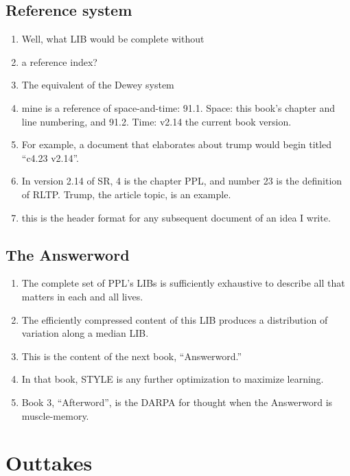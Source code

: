 \documentclass[
]{book}
\providecommand{\tightlist}{%
  \setlength{\itemsep}{0pt}\setlength{\parskip}{0pt}}
\begin{document}
\hypertarget{reference-system}{%
\subsection{Reference system}\label{reference-system}}

\begin{enumerate}
\def\labelenumi{\arabic{enumi}.}
\setcounter{enumi}{87}
\tightlist
\item
  Well, what LIB would be complete without
\item
  a reference index?
\item
  The equivalent of the Dewey system
\item
  mine is a reference of space-and-time:
  91.1. Space: this book's chapter and line numbering, and
  91.2. Time: v2.14 the current book version.
\item
  For example, a document that elaborates about trump would begin titled ``c4.23 v2.14''.
\item
  In version 2.14 of SR, 4 is the chapter PPL, and number 23 is the definition of RLTP. Trump, the article topic, is an example.
\item
  this is the header format for any subsequent document of an idea I write.
\end{enumerate}

\hypertarget{the-answerword}{%
\subsection{The Answerword}\label{the-answerword}}

\begin{enumerate}
\def\labelenumi{\arabic{enumi}.}
\setcounter{enumi}{94}
\item
  The complete set of PPL's LIBs is sufficiently exhaustive to describe all that matters in each and all lives.
\item
  The efficiently compressed content of this LIB produces a distribution of variation along a median LIB.
\item
  This is the content of the next book, ``Answerword.''
\item
  In that book, STYLE is any further optimization to maximize learning.
\item
  Book 3, ``Afterword'', is the DARPA for thought when the Answerword is muscle-memory.
\end{enumerate}

\hypertarget{outtakes}{%
\section{Outtakes}\label{outtakes}}
\end{document}
